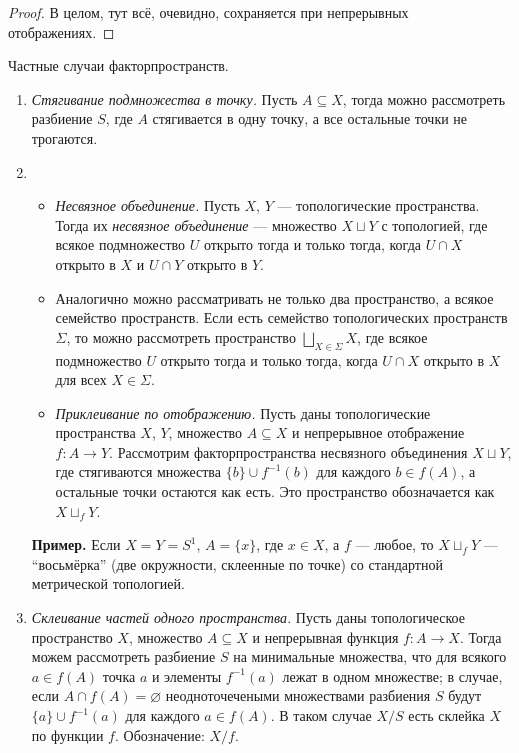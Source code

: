 \documentclass[a4paper,100pt]{article}
\theoremstyle{indented}
\begin{document}
\begin{proof}
    В целом, тут всё, очевидно, сохраняется при непрерывных отображениях.
\end{proof}


    Частные случаи факторпространств.
    \begin{enumerate}
        \item \emph{Стягивание подмножества в точку.} Пусть $A \subseteq X$, тогда можно рассмотреть разбиение $S$, где $A$ стягивается в одну точку, а все остальные точки не трогаются.

        \item
        \begin{itemize}
            \item \emph{Несвязное объединение.} Пусть $X$, $Y$ --- топологические пространства. Тогда их \emph{несвязное объединение} --- множество $X \sqcup Y$ с топологией, где всякое подмножество $U$ открыто тогда и только тогда, когда $U \cap X$ открыто в $X$ и $U \cap Y$ открыто в $Y$.
            \item Аналогично можно рассматривать не только два пространство, а всякое семейство пространств. Если есть семейство топологических пространств $\Sigma$, то можно рассмотреть пространство $\bigsqcup_{X \in \Sigma} X$, где всякое подмножество $U$ открыто тогда и только тогда, когда $U \cap X$ открыто в $X$ для всех $X \in \Sigma$.
            \item \emph{Приклеивание по отображению.} Пусть даны топологические пространства $X$, $Y$, множество $A \subseteq X$ и непрерывное отображение $f: A \to Y$. Рассмотрим факторпространства несвязного объединения $X \sqcup Y$, где стягиваются множества $\{b\} \cup f^{-1}(b)$ для каждого $b \in f(A)$, а остальные точки остаются как есть. Это пространство обозначается как $X \sqcup_f Y$.
        \end{itemize}
        
            \textbf{Пример. }Если $X = Y = S^1$, $A = \{x\}$, где $x \in X$, а $f$ --- любое, то $X \sqcup_f Y$ --- ``восьмёрка'' (две окружности, склеенные по точке) со стандартной метрической топологией.
        

        \item \emph{Склеивание частей одного пространства.} Пусть даны топологическое пространство $X$, множество $A \subseteq X$ и непрерывная функция $f: A \to X$. Тогда можем рассмотреть разбиение $S$ на минимальные множества, что для всякого $a \in f(A)$ точка $a$ и элементы $f^{-1}(a)$ лежат в одном множестве; в случае, если $A \cap f(A) = \varnothing$ неодноточечеными множествами разбиения $S$ будут $\{a\} \cup f^{-1}(a)$ для каждого $a \in f(A)$. В таком случае $X/S$ есть склейка $X$ по функции $f$. Обозначение: $X/f$.\\
        

\end{enumerate}
\end{document}
